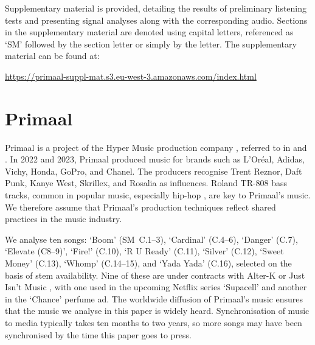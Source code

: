 \documentclass{article}
\begin{document}
Supplementary material is provided, detailing the results of preliminary listening tests and presenting signal analyses along with the corresponding audio. Sections in the supplementary material are denoted using capital letters, referenced as `SM' followed by the section letter or simply by the letter. The supplementary material can be found at:

\begin{center}
\url{https://primaal-suppl-mat.s3.eu-west-3.amazonaws.com/index.html}
\end{center}






\section{Primaal}\label{sec:Primaal}


Primaal is a project of the Hyper Music production company \citep{hypermusic}, referred to in \citet{deruty2022development} and \citet{deruty2022melatonin}. In 2022 and 2023, Primaal produced music for brands such as L'Or\'eal, Adidas, Vichy, Honda, GoPro, and Chanel. The producers recognise Trent Reznor, Daft Punk, Kanye West, Skrillex, and Rosalia as influences. Roland TR-808 bass tracks, common in popular music, especially hip-hop \citep{lavoie2020}, are key to Primaal's music. We therefore assume that Primaal's production techniques reflect shared practices in the music industry.  

We analyse ten songs: `Boom' (SM~C.1--3), `Cardinal' (C.4--6), `Danger' (C.7), `Elevate (C8--9)', `Fire!' (C.10), `R U Ready' (C.11), `Silver' (C.12), `Sweet Money' (C.13), `Whomp' (C.14--15), and `Yada Yada' (C.16), selected on the basis of stem availability. Nine of these are under contracts with Alter-K \citep{AlterK2024} or Just Isn't Music \citep{Justisntmusic2024}, with one used in the upcoming Netflix series `Supacell' and another in the `Chance' perfume ad. The worldwide diffusion of Primaal's music ensures that the music we analyse in this paper is widely heard. Synchronisation of music to media typically takes ten months to two years, so more songs may have been synchronised by the time this paper goes to press.



\end{document}
